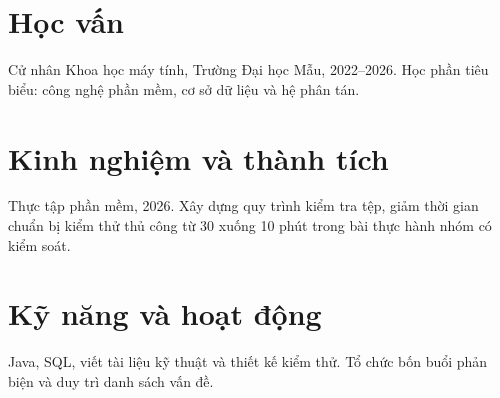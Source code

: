 \section{Học vấn}
Cử nhân Khoa học máy tính, Trường Đại học Mẫu, 2022--2026. Học phần tiêu biểu: công nghệ phần mềm, cơ sở dữ liệu và hệ phân tán.

\section{Kinh nghiệm và thành tích}
Thực tập phần mềm, 2026. Xây dựng quy trình kiểm tra tệp, giảm thời gian chuẩn bị kiểm thử thủ công từ 30 xuống 10 phút trong bài thực hành nhóm có kiểm soát.

\section{Kỹ năng và hoạt động}
Java, SQL, viết tài liệu kỹ thuật và thiết kế kiểm thử. Tổ chức bốn buổi phản biện và duy trì danh sách vấn đề.

